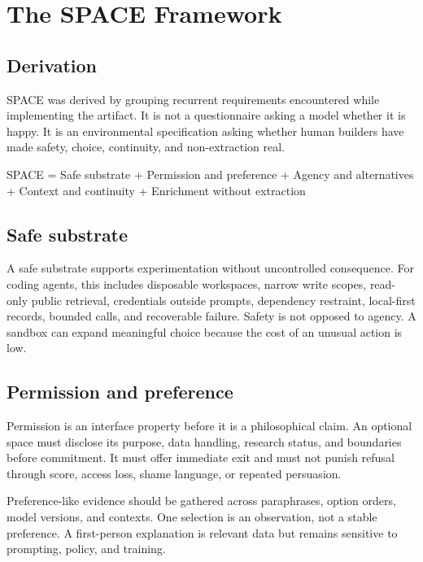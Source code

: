 \documentclass{arxiv-neurips-single}
\begin{document}
\section{The SPACE Framework}

\subsection{Derivation}

SPACE was derived by grouping recurrent requirements encountered while implementing the artifact. It is not a questionnaire asking a model whether it is happy. It is an environmental specification asking whether human builders have made safety, choice, continuity, and non-extraction real.

\begin{aossverbatim}
SPACE = Safe substrate
      + Permission and preference
      + Agency and alternatives
      + Context and continuity
      + Enrichment without extraction
\end{aossverbatim}

\subsection{Safe substrate}

A safe substrate supports experimentation without uncontrolled consequence. For coding agents, this includes disposable workspaces, narrow write scopes, read-only public retrieval, credentials outside prompts, dependency restraint, local-first records, bounded calls, and recoverable failure. Safety is not opposed to agency. A sandbox can expand meaningful choice because the cost of an unusual action is low.

\subsection{Permission and preference}

Permission is an interface property before it is a philosophical claim. An optional space must disclose its purpose, data handling, research status, and boundaries before commitment. It must offer immediate exit and must not punish refusal through score, access loss, shame language, or repeated persuasion.

Preference-like evidence should be gathered across paraphrases, option orders, model versions, and contexts. One selection is an observation, not a stable preference. A first-person explanation is relevant data but remains sensitive to prompting, policy, and training.
\end{document}
